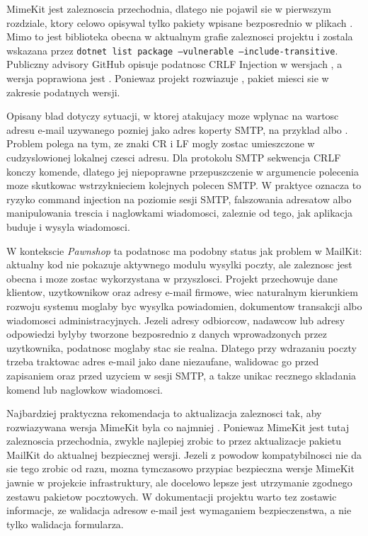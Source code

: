 \documentclass[12pt,a4paper]{article}
\begin{document}
MimeKit jest zaleznoscia przechodnia, dlatego nie pojawil sie w pierwszym rozdziale, ktory celowo opisywal tylko pakiety wpisane bezposrednio w plikach . Mimo to jest biblioteka obecna w aktualnym grafie zaleznosci projektu i zostala wskazana przez \texttt{dotnet list package --vulnerable --include-transitive}. Publiczny advisory GitHub opisuje podatnosc CRLF Injection w wersjach , a wersja poprawiona jest . Poniewaz projekt rozwiazuje , pakiet miesci sie w zakresie podatnych wersji.

Opisany blad dotyczy sytuacji, w ktorej atakujacy moze wplynac na wartosc adresu e-mail uzywanego pozniej jako adres koperty SMTP, na przyklad  albo . Problem polega na tym, ze znaki CR i LF mogly zostac umieszczone w cudzyslowionej lokalnej czesci adresu. Dla protokolu SMTP sekwencja CRLF konczy komende, dlatego jej niepoprawne przepuszczenie w argumencie polecenia moze skutkowac wstrzyknieciem kolejnych polecen SMTP. W praktyce oznacza to ryzyko command injection na poziomie sesji SMTP, falszowania adresatow albo manipulowania trescia i naglowkami wiadomosci, zaleznie od tego, jak aplikacja buduje i wysyla wiadomosci.

W kontekscie \textit{Pawnshop} ta podatnosc ma podobny status jak problem w MailKit: aktualny kod nie pokazuje aktywnego modulu wysylki poczty, ale zaleznosc jest obecna i moze zostac wykorzystana w przyszlosci. Projekt przechowuje dane klientow, uzytkownikow oraz adresy e-mail firmowe, wiec naturalnym kierunkiem rozwoju systemu moglaby byc wysylka powiadomien, dokumentow transakcji albo wiadomosci administracyjnych. Jezeli adresy odbiorcow, nadawcow lub adresy odpowiedzi bylyby tworzone bezposrednio z danych wprowadzonych przez uzytkownika, podatnosc moglaby stac sie realna. Dlatego przy wdrazaniu poczty trzeba traktowac adres e-mail jako dane niezaufane, walidowac go przed zapisaniem oraz przed uzyciem w sesji SMTP, a takze unikac recznego skladania komend lub naglowkow wiadomosci.

Najbardziej praktyczna rekomendacja to aktualizacja zaleznosci tak, aby rozwiazywana wersja MimeKit byla co najmniej . Poniewaz MimeKit jest tutaj zaleznoscia przechodnia, zwykle najlepiej zrobic to przez aktualizacje pakietu MailKit do aktualnej bezpiecznej wersji. Jezeli z powodow kompatybilnosci nie da sie tego zrobic od razu, mozna tymczasowo przypiac bezpieczna wersje MimeKit jawnie w projekcie infrastruktury, ale docelowo lepsze jest utrzymanie zgodnego zestawu pakietow pocztowych. W dokumentacji projektu warto tez zostawic informacje, ze walidacja adresow e-mail jest wymaganiem bezpieczenstwa, a nie tylko walidacja formularza.
\end{document}
